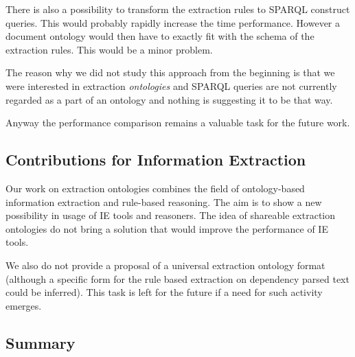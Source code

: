 There is also a possibility to transform the extraction rules to SPARQL construct queries. This would probably rapidly increase the time performance. However a document ontology would then have to exactly fit with the schema of the extraction rules.  This would be a minor problem. 

The reason why we did not study this approach from the beginning is that we were interested in extraction \emph{ontologies} and SPARQL queries are not currently regarded as a part of an ontology and nothing is suggesting it to be that way.  

Anyway the performance comparison remains a valuable task for the future work.

\subsection{Contributions for Information Extraction}

Our work on extraction ontologies combines the field of ontology-based information extraction and rule-based reasoning. The aim is to show a new possibility in usage of IE tools and reasoners. The idea of shareable extraction ontologies do not bring a solution that would improve the performance of IE tools.

We also do not provide a proposal of a universal extraction ontology format (although a specific form for the rule based extraction on dependency parsed text could be inferred). This task is left for the future if a need for such activity emerges.


\subsection{Summary} \label{sec:onto_conclusion}


